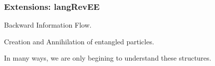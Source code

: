 \documentclass[svgnames,11pt]{beamer}
\begin{document}
\begin{frame}
\frametitle{Extensions: {{langRevEE}} }



\begin{multicols}{2}
\begin{center}
\end{center}
  
\begin{center}
\end{center}  
\end{multicols}

\begin{center}
 Backward Information Flow. 
\end{center}

\begin{multicols}{2}
\begin{center}
\end{center}

\begin{center}
\end{center}  
\end{multicols}

\begin{center}
 Creation and Annihilation of entangled particles. 
\end{center}


In many ways, we are only begining to understand these structures. 


\end{frame}
\end{document}
